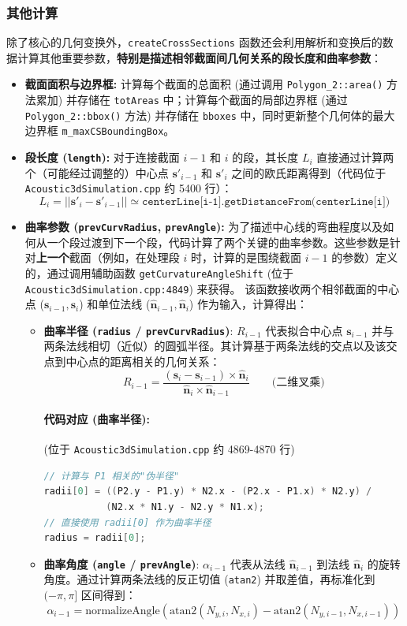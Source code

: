 \documentclass{ctexart}
\begin{document}
\subsubsection{其他计算}
除了核心的几何变换外，\texttt{createCrossSections} 函数还会利用解析和变换后的数据计算其他重要参数，\textbf{特别是描述相邻截面间几何关系的段长度和曲率参数}：
\begin{itemize}
    \item \textbf{截面面积与边界框:} 计算每个截面的总面积 (通过调用 \texttt{Polygon\_2::area()} 方法累加) 并存储在 \texttt{totAreas} 中；计算每个截面的局部边界框 (通过 \texttt{Polygon\_2::bbox()} 方法) 并存储在 \texttt{bboxes} 中，同时更新整个几何体的最大边界框 \texttt{m\_maxCSBoundingBox}。
    \item \textbf{段长度 (\texttt{length}):} 对于连接截面 \(i-1\) 和 \(i\) 的段，其长度 \(L_i\) 直接通过计算两个（可能经过调整的）中心点 \({\mathbf{s}'}_{i-1}\) 和 \({\mathbf{s}'}_i\) 之间的欧氏距离得到（代码位于 \texttt{Acoustic3dSimulation.cpp} 约 5400 行）：
    \[ L_i = || {\mathbf{s}'}_i - {\mathbf{s}'}_{i-1} || \simeq \texttt{centerLine[i-1].getDistanceFrom(centerLine[i])} \]
    \item \textbf{曲率参数 (\texttt{prevCurvRadius}, \texttt{prevAngle}):} 为了描述中心线的弯曲程度以及如何从一个段过渡到下一个段，代码计算了两个关键的曲率参数。这些参数是针对\textbf{上一个}截面（例如，在处理段 \(i\) 时，计算的是围绕截面 \(i-1\) 的参数）定义的，通过调用辅助函数 \texttt{getCurvatureAngleShift} (位于 \texttt{Acoustic3dSimulation.cpp:4849}) 来获得。
        该函数接收两个相邻截面的中心点 (\(\mathbf{s}_{i-1}, \mathbf{s}_i\)) 和单位法线 (\(\hat{\mathbf{n}}_{i-1}, \hat{\mathbf{n}}_i\)) 作为输入，计算得出：
        \begin{itemize}
            \item \textbf{曲率半径 (\texttt{radius} / \texttt{prevCurvRadius})}: \(R_{i-1}\) 代表拟合中心点 \(\mathbf{s}_{i-1}\) 并与两条法线相切（近似）的圆弧半径。其计算基于两条法线的交点以及该交点到中心点的距离相关的几何关系：
            \[ R_{i-1} = \frac{(\mathbf{s}_i - \mathbf{s}_{i-1}) \times \hat{\mathbf{n}}_i}{\hat{\mathbf{n}}_i \times \hat{\mathbf{n}}_{i-1}} \qquad \text{(二维叉乘)} \]
            \paragraph{代码对应 (曲率半径):} (位于 \texttt{Acoustic3dSimulation.cpp} 约 4869-4870 行)
            \begin{lstlisting}[language=C++]
// 计算与 P1 相关的"伪半径"
radii[0] = ((P2.y - P1.y) * N2.x - (P2.x - P1.x) * N2.y) /
           (N2.x * N1.y - N2.y * N1.x);
// 直接使用 radii[0] 作为曲率半径
radius = radii[0];
            \end{lstlisting}
            \item \textbf{曲率角度 (\texttt{angle} / \texttt{prevAngle})}: \(\alpha_{i-1}\) 代表从法线 \(\hat{\mathbf{n}}_{i-1}\) 到法线 \(\hat{\mathbf{n}}_i\) 的旋转角度。通过计算两条法线的反正切值 (\texttt{atan2}) 并取差值，再标准化到 \( (-\pi, \pi] \) 区间得到：
            \[ \alpha_{i-1} = \text{normalizeAngle}(\text{atan2}(N_{y,i}, N_{x,i}) - \text{atan2}(N_{y,i-1}, N_{x,i-1})) \]

\end{itemize}
\end{itemize}
\end{document}
